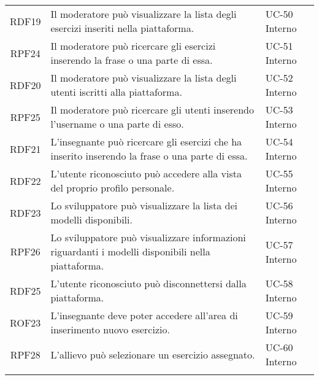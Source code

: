 \begin{tabularx}{\textwidth}{| c | p{10cm} | X |}
		RDF19 & Il moderatore può visualizzare la lista degli esercizi inseriti nella piattaforma. & UC-50 \newline Interno\\
		RPF24 & Il moderatore può ricercare gli esercizi inserendo la frase o una parte di essa. & UC-51 \newline Interno\\
		RDF20 & Il moderatore può visualizzare la lista degli utenti iscritti alla piattaforma. & UC-52 \newline Interno\\
		RPF25 & Il moderatore può ricercare gli utenti inserendo l'username o una parte di esso. & UC-53 \newline Interno\\
		RDF21 & L'insegnante può ricercare gli esercizi che ha inserito inserendo la frase o una parte di essa. & UC-54 \newline Interno\\
		RDF22 & L'utente riconosciuto può accedere alla vista del proprio profilo personale. & UC-55 \newline Interno\\
		RDF23 & Lo sviluppatore può visualizzare la lista dei modelli disponibili. & UC-56 \newline Interno\\
		RPF26 & Lo sviluppatore può visualizzare informazioni riguardanti i modelli disponibili nella piattaforma. & UC-57 \newline Interno\\
		RDF25 & L'utente riconosciuto può disconnettersi dalla piattaforma. & UC-58 \newline Interno\\
		ROF23 & L'insegnante deve poter accedere all'area di inserimento nuovo esercizio. & UC-59 \newline Interno\\
		RPF28 & L'allievo può selezionare un esercizio assegnato. & UC-60 \newline Interno\\
		\hline
		\caption{Tabella dei requisiti funzionali}
\end{tabularx}

